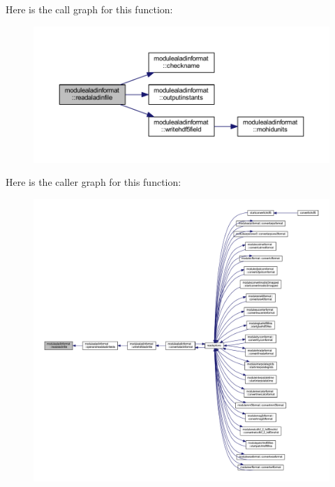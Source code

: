 Here is the call graph for this function\+:\nopagebreak
\begin{figure}[H]
\begin{center}
\leavevmode
\includegraphics[width=350pt]{namespacemodulealadinformat_a01a53a6349fe1f7a1e5973e60abcf19d_cgraph}
\end{center}
\end{figure}
Here is the caller graph for this function\+:\nopagebreak
\begin{figure}[H]
\begin{center}
\leavevmode
\includegraphics[width=350pt]{namespacemodulealadinformat_a01a53a6349fe1f7a1e5973e60abcf19d_icgraph}
\end{center}
\end{figure}
\mbox{\label{namespacemodulealadinformat_aae35e2c47a633497f92dcf61c358e656}} 

